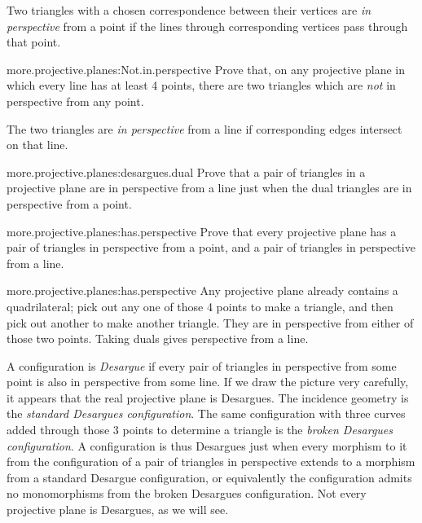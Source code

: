 Two triangles with a chosen correspondence between their vertices are \emph{in perspective} from a point if the lines through corresponding vertices pass through that point.
\begin{problem}{more.projective.planes:Not.in.perspective}
Prove that, on any projective plane in which every line has at least 4 points, there are two triangles which are \emph{not} in perspective from any point.
\end{problem}

The two triangles are \emph{in perspective} from a line if corresponding edges intersect on that line.
\begin{problem}{more.projective.planes:desargues.dual}
Prove that a pair of triangles in a projective plane are in perspective from a line just when the dual triangles are in perspective from a point.
\end{problem}
\begin{problem}{more.projective.planes:has.perspective}
Prove that every projective plane has a pair of triangles in perspective from a point, and a pair of triangles in perspective from a line.
\end{problem}
\begin{answer}{more.projective.planes:has.perspective}
Any projective plane already contains a quadrilateral; pick out any one of those 4 points to make a triangle, and then pick out another to make another triangle.
They are in perspective from either of those two points.
Taking duals gives perspective from a line.
\end{answer}
A configuration is \emph{Desargue} if every pair of triangles in perspective from some point is also in perspective from some line.
If we draw the picture very carefully, it appears that the real projective plane is Desargues.
The incidence geometry
is the \emph{standard Desargues configuration}.
The same configuration with three curves added through those \(3\) points to determine a triangle is the \emph{broken Desargues configuration}.
A configuration is thus Desargues just when every morphism to it from the configuration of a pair of triangles in perspective extends to a morphism from a standard Desargue configuration, or equivalently the configuration admits no monomorphisms from the broken Desargues configuration.
Not every projective plane is Desargues, as we will see.

